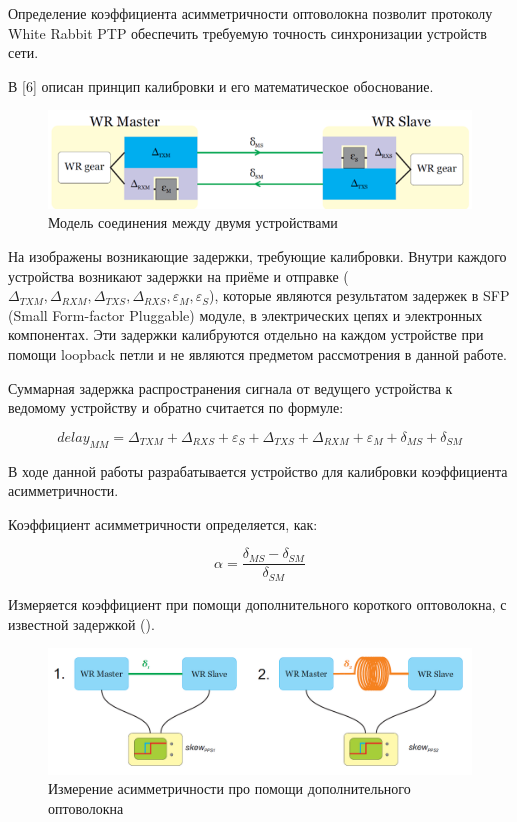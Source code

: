 Определение коэффициента асимметричности оптоволокна позволит протоколу White Rabbit PTP обеспечить требуемую точность синхронизации устройств сети.

В [6] описан принцип калибровки и его математическое обоснование.\\

\begin{figure}[ht!] 
	\center
	\includegraphics  {my_folder/images//conn_model}
	\caption{Модель соединения между двумя устройствами} 
	\label{fig:conn-model}  
\end{figure}

На  изображены возникающие задержки, требующие калибровки. Внутри каждого устройства 
возникают задержки на приёме и отправке ($\Delta_{TXM},\Delta_{RXM},\Delta_{TXS},\Delta_{RXS}, \varepsilon_{M},\varepsilon_{S}$),
которые являются результатом задержек в SFP (Small Form-factor Pluggable) 
модуле, в электрических цепях и электронных компонентах. Эти задержки калибруются отдельно на каждом устройстве при помощи loopback петли и не являются
предметом рассмотрения в данной работе.

Суммарная задержка распространения сигнала от ведущего устройства к ведомому устройству и обратно считается по формуле:

\begin{equation}
delay_{MM} = \Delta_{TXM} + \Delta_{RXS} + \varepsilon_{S} + \Delta_{TXS} + \Delta_{RXM} + \varepsilon_{M} + \delta_{MS} + \delta_{SM}
\end{equation}

В ходе данной работы разрабатывается устройство для калибровки коэффициента асимметричности.

Коэффициент асимметричности определяется, как:

\begin{equation}
	\alpha = \frac{\delta_{MS} - \delta_{SM}}{\delta_{SM}}
\end{equation}

Измеряется коэффициент при помощи дополнительного короткого оптоволокна, с известной задержкой ().

\begin{figure}[ht!] 
	\center
	\includegraphics [scale=0.4] {my_folder/images//meas_scheme_1}
	\caption{Измерение асимметричности про помощи дополнительного оптоволокна} 
	\label{fig:meas-scheme-1}  
\end{figure}

